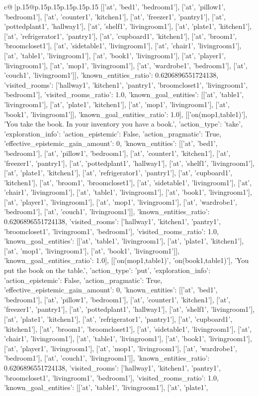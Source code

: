 \documentclass{article}
\begin{document}
{\begin{supertabular}{c@{$\;$}|p{.15\linewidth}@{}p{.15\linewidth}p{.15\linewidth}p{.15\linewidth}p{.15\linewidth}p{.15\linewidth}}
{{{[['at', 'bed1', 'bedroom1'], ['at', 'pillow1', 'bedroom1'], ['at', 'counter1', 'kitchen1'], ['at', 'freezer1', 'pantry1'], ['at', 'pottedplant1', 'hallway1'], ['at', 'shelf1', 'livingroom1'], ['at', 'plate1', 'kitchen1'], ['at', 'refrigerator1', 'pantry1'], ['at', 'cupboard1', 'kitchen1'], ['at', 'broom1', 'broomcloset1'], ['at', 'sidetable1', 'livingroom1'], ['at', 'chair1', 'livingroom1'], ['at', 'table1', 'livingroom1'], ['at', 'book1', 'livingroom1'], ['at', 'player1', 'livingroom1'], ['at', 'mop1', 'livingroom1'], ['at', 'wardrobe1', 'bedroom1'], ['at', 'couch1', 'livingroom1']], 'known_entities_ratio': 0.6206896551724138, 'visited_rooms': ['hallway1', 'kitchen1', 'pantry1', 'broomcloset1', 'livingroom1', 'bedroom1'], 'visited_rooms_ratio': 1.0, 'known_goal_entities': [['at', 'table1', 'livingroom1'], ['at', 'plate1', 'kitchen1'], ['at', 'mop1', 'livingroom1'], ['at', 'book1', 'livingroom1']], 'known_goal_entities_ratio': 1.0}}], [['on(mop1,table1)'], 'You take the book. In your inventory you have a book.', {'action_type': 'take', 'exploration_info': {'action_epistemic': False, 'action_pragmatic': True, 'effective_epistemic_gain_amount': 0, 'known_entities': [['at', 'bed1', 'bedroom1'], ['at', 'pillow1', 'bedroom1'], ['at', 'counter1', 'kitchen1'], ['at', 'freezer1', 'pantry1'], ['at', 'pottedplant1', 'hallway1'], ['at', 'shelf1', 'livingroom1'], ['at', 'plate1', 'kitchen1'], ['at', 'refrigerator1', 'pantry1'], ['at', 'cupboard1', 'kitchen1'], ['at', 'broom1', 'broomcloset1'], ['at', 'sidetable1', 'livingroom1'], ['at', 'chair1', 'livingroom1'], ['at', 'table1', 'livingroom1'], ['at', 'book1', 'livingroom1'], ['at', 'player1', 'livingroom1'], ['at', 'mop1', 'livingroom1'], ['at', 'wardrobe1', 'bedroom1'], ['at', 'couch1', 'livingroom1']], 'known_entities_ratio': 0.6206896551724138, 'visited_rooms': ['hallway1', 'kitchen1', 'pantry1', 'broomcloset1', 'livingroom1', 'bedroom1'], 'visited_rooms_ratio': 1.0, 'known_goal_entities': [['at', 'table1', 'livingroom1'], ['at', 'plate1', 'kitchen1'], ['at', 'mop1', 'livingroom1'], ['at', 'book1', 'livingroom1']], 'known_goal_entities_ratio': 1.0}}], [['on(mop1,table1)', 'on(book1,table1)'], 'You put the book on the table.', {'action_type': 'put', 'exploration_info': {'action_epistemic': False, 'action_pragmatic': True, 'effective_epistemic_gain_amount': 0, 'known_entities': [['at', 'bed1', 'bedroom1'], ['at', 'pillow1', 'bedroom1'], ['at', 'counter1', 'kitchen1'], ['at', 'freezer1', 'pantry1'], ['at', 'pottedplant1', 'hallway1'], ['at', 'shelf1', 'livingroom1'], ['at', 'plate1', 'kitchen1'], ['at', 'refrigerator1', 'pantry1'], ['at', 'cupboard1', 'kitchen1'], ['at', 'broom1', 'broomcloset1'], ['at', 'sidetable1', 'livingroom1'], ['at', 'chair1', 'livingroom1'], ['at', 'table1', 'livingroom1'], ['at', 'book1', 'livingroom1'], ['at', 'player1', 'livingroom1'], ['at', 'mop1', 'livingroom1'], ['at', 'wardrobe1', 'bedroom1'], ['at', 'couch1', 'livingroom1']], 'known_entities_ratio': 0.6206896551724138, 'visited_rooms': ['hallway1', 'kitchen1', 'pantry1', 'broomcloset1', 'livingroom1', 'bedroom1'], 'visited_rooms_ratio': 1.0, 'known_goal_entities': [['at', 'table1', 'livingroom1'], ['at', 'plate1', }}}
\end{supertabular}}
\end{document}
